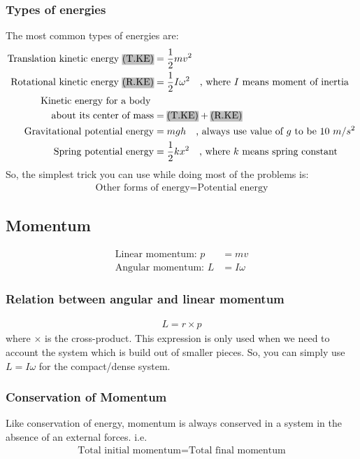 \subsubsection{Types of energies}
The most common types of energies are:
\begin{align}
\text{Translation kinetic energy \hlgray{(T.KE)}} &= \frac{1}{2}m v^{2} \\
\text{Rotational kinetic energy \hlgray{(R.KE)}} &= \frac{1}{2} I \omega^{2} \quad \text{, where $I$ means moment of inertia}\\
\text{Kinetic energy for a body }& \nonumber\\
\text{about its center of mass} &= \text{\hlgray{(T.KE)}} + \text{\hlgray{(R.KE)}} \\
\text{Gravitational potential energy} &= mgh \quad \text{, always use value of $g$ to be 10 $m/s^{2}$} \\
\text{Spring potential energy} &= \frac{1}{2}k x^{2} \quad \text{, where $k$ means spring constant}
\end{align}
So, the simplest trick you can use while doing most of the problems is:
\begin{align*}
\text{Other forms of energy} = \text{Potential energy}
\end{align*}

\subsection{Momentum}
\begin{align*}
\text{Linear momentum: } p &= mv \\
\text{Angular momentum: } L &= I\omega
\end{align*}

\subsubsection{Relation between angular and linear momentum}
\begin{align}
L = r \times p
\end{align}
where $\times$ is the cross-product. This expression is only used when we need to account the system which is build out of smaller pieces. So, you can simply use $ L = I\omega$ for the compact/dense system.

\subsubsection{Conservation of Momentum}
Like conservation of energy, momentum is always conserved in a system in the absence of an external forces. i.e.
\begin{align*}
\text{Total initial momentum} = \text{Total final momentum}
\end{align*}


